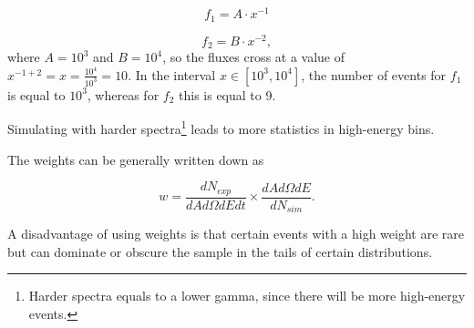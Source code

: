 \begin{appendices}
\begin{itemize}
\begin{equation}
f_1 = A \cdot x^{-1}
\end{equation}

\begin{equation}
f_2 = B \cdot x^{-2},
\end{equation}
\noindent where $A = 10^3$ and $B = 10^4$, so the fluxes cross at a value of $x^{-1+2} = x = \frac{10^4}{10^3} = 10$. In the interval $x \in [10^3,10^4]$, the number of events for $f_1$ is equal to $10^3$, whereas for $f_2$ this is equal to 9.

Simulating with harder spectra\footnote{Harder spectra equals to a lower gamma, since there will be more high-energy events.} leads to more statistics in high-energy bins.
\end{itemize}
\vspace{3mm}
\noindent The weights can be generally written down as

\begin{equation}
w = \frac{dN_{exp}}{dA d\Omega dE dt} \times \frac{dA d\Omega dE}{dN_{sim}}.
\end{equation}

\vspace{3mm}
\noindent A disadvantage of using weights is that certain events with a high weight are rare but can dominate or obscure the sample in the tails of certain distributions.

\end{appendices}